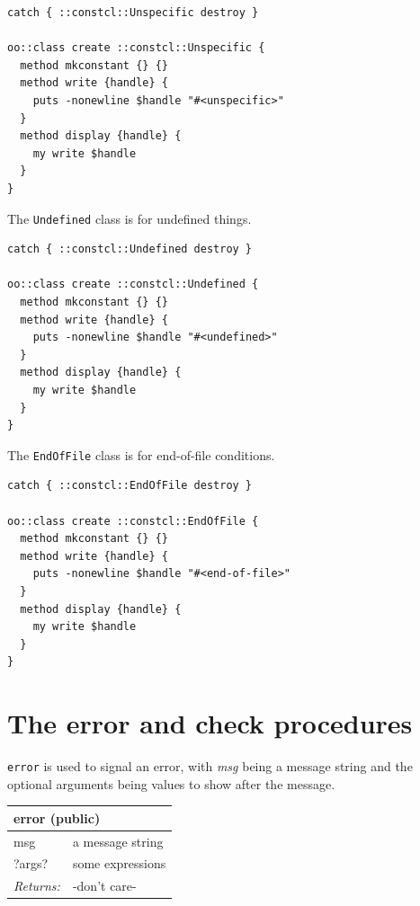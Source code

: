 \documentclass[twoside,9pt]{report}
\begin{document}
\noindent\makebox[\linewidth]{\rule{\linewidth}{0.4pt}}
\begin{lstlisting}
catch { ::constcl::Unspecific destroy }
 
oo::class create ::constcl::Unspecific {
  method mkconstant {} {}
  method write {handle} {
    puts -nonewline $handle "#<unspecific>"
  }
  method display {handle} {
    my write $handle
  }
}
\end{lstlisting}
\noindent\makebox[\linewidth]{\rule{\linewidth}{0.4pt}}

The \texttt{Undefined} class is for undefined things.

\noindent\makebox[\linewidth]{\rule{\linewidth}{0.4pt}}
\begin{lstlisting}
catch { ::constcl::Undefined destroy }
 
oo::class create ::constcl::Undefined {
  method mkconstant {} {}
  method write {handle} {
    puts -nonewline $handle "#<undefined>"
  }
  method display {handle} {
    my write $handle
  }
}
\end{lstlisting}
\noindent\makebox[\linewidth]{\rule{\linewidth}{0.4pt}}

The \texttt{EndOfFile} class is for end-of-file conditions.

\noindent\makebox[\linewidth]{\rule{\linewidth}{0.4pt}}
\begin{lstlisting}
catch { ::constcl::EndOfFile destroy }
 
oo::class create ::constcl::EndOfFile {
  method mkconstant {} {}
  method write {handle} {
    puts -nonewline $handle "#<end-of-file>"
  }
  method display {handle} {
    my write $handle
  }
}
\end{lstlisting}
\noindent\makebox[\linewidth]{\rule{\linewidth}{0.4pt}}
\section{The error and check procedures}
\label{the-error-and-check-procedures}

\texttt{error} is used to signal an error, with \emph{msg} being a message string and the optional arguments being values to show after the message.

\begin{tabular}{ |l l| }
\hline
\multicolumn{2}{|l|}{error (public)} \\
\hline
msg & a message string \\
?args? & some expressions \\
\textit{Returns:} & -don't care- \\
\hline
\end{tabular}
\end{document}
